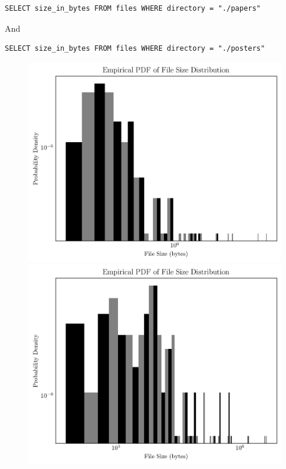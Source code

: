 \documentclass{article}
\begin{document}
\begin{small}
\begin{verbatim}
SELECT size_in_bytes FROM files WHERE directory = "./papers"
\end{verbatim}
\end{small}

And

\begin{small}
\begin{verbatim}
SELECT size_in_bytes FROM files WHERE directory = "./posters"
\end{verbatim}
\end{small}

\begin{figure}[htbp]
\centering

\begin{minipage}{.5\linewidth}
\centering
{}
\includegraphics[width=\linewidth]{./images/papers_size_pdf.png}
\end{minipage}%
\begin{minipage}{.5\linewidth}
\centering

\includegraphics[width=\linewidth]{./images/posters_size_pdf.png}
\end{minipage}

\end{figure}
\end{document}
